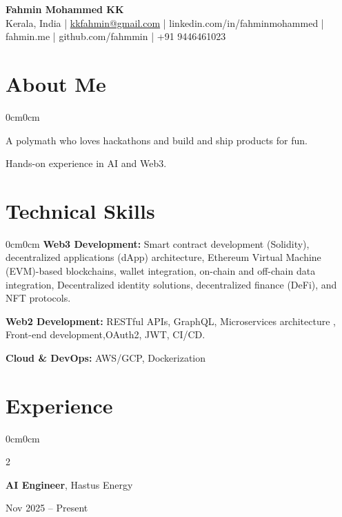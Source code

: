 \documentclass[10pt, letterpaper]{article}
\newenvironment{onecolentry}{\begin{adjustwidth}{0cm}{0cm}}{\end{adjustwidth}}
\newenvironment{twocolentry}[1]{
  \onecolentry
  \def\secondColumn{#1}
  \setcolumnwidth{\fill, 4.3cm}
  \begin{paracol}{2}
}{
  \switchcolumn \raggedleft \secondColumn
  \end{paracol}
  \endonecolentry
}
\begin{document}
\begin{center}
  {\Huge \textbf{Fahmin Mohammed KK}} \\[-2pt]
  Kerala, India \;|\;
  \href{mailto:kkfahmin@gmail.com}{kkfahmin@gmail.com} \;|\;
  linkedin.com/in/fahminmohammed \;|\;
  fahmin.me \;|\;
  github.com/fahmmin \;|\;
  +91 9446461023
\end{center}

\section{About Me}
\begin{onecolentry}
\item A polymath who loves hackathons and build and ship products for fun.
\item Hands-on experience in AI and Web3.
\end{onecolentry}

\section{Technical Skills}

\begin{onecolentry}
  \textbf{Web3 Development:} Smart contract development (Solidity), decentralized applications (dApp) architecture, Ethereum Virtual Machine (EVM)-based blockchains, wallet integration, on-chain and off-chain data integration, Decentralized identity solutions, decentralized finance (DeFi), and NFT protocols. 
      \vspace{0.5em}

  \textbf{Web2 Development:} RESTful APIs, GraphQL, Microservices architecture , Front-end development,OAuth2, JWT, CI/CD.
    \vspace{0.5em}

  \textbf{Cloud \& DevOps:} AWS/GCP, Dockerization
\end{onecolentry}

\section{Experience}



\begin{twocolentry}{Nov 2025 -- Present}
\textbf{AI Engineer}, Hastus Energy
\end{twocolentry}
\end{document}
